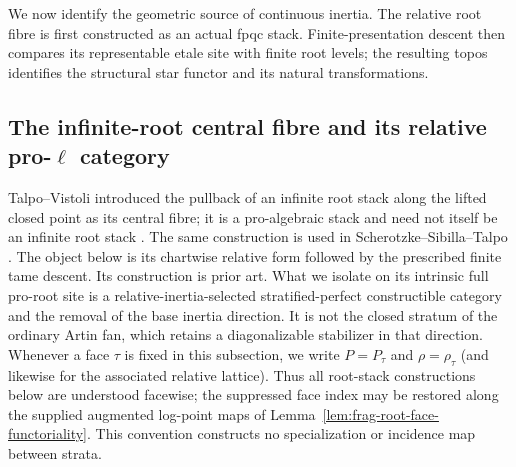 \documentclass[11pt]{article}
\theoremstyle{definition}
\theoremstyle{remark}
\begin{document}
We now identify the geometric source of continuous inertia.  The
relative root fibre is first constructed as an actual fpqc stack.
Finite-presentation descent then compares its representable etale site
with finite root levels; the resulting topos identifies the structural
star functor and its natural transformations.

\subsection{The infinite-root central fibre and its relative
\texorpdfstring{pro-$\ell$}{pro-l} category}
\label{frag:geometric-artin-face}

Talpo--Vistoli introduced the pullback of an infinite root stack along the
lifted closed point as its central fibre; it is a pro-algebraic stack and need
not itself be an infinite root stack
\cite{TalpoVistoliInfiniteRoot}.  The same construction is used in
Scherotzke--Sibilla--Talpo
\cite{ScherotzkeSibillaTalpoMcKay}.  The object below is its chartwise relative
form followed by the prescribed finite tame descent.  Its construction is
prior art.  What we isolate on its intrinsic full pro-root site is a
relative-inertia-selected stratified-perfect constructible category and the removal of
the base inertia direction.  It is not
the closed stratum of the ordinary Artin fan, which retains a diagonalizable
stabilizer in that direction.
Whenever a face $\tau$ is fixed in this subsection, we write
$P=P_\tau$ and $\rho=\rho_\tau$ (and likewise for the associated relative
lattice).  Thus all root-stack constructions below are understood facewise;
the suppressed face index may be restored along the supplied augmented
log-point maps of Lemma~\ref{lem:frag-root-face-functoriality}.
This convention constructs no specialization or incidence map between
strata.
\end{document}
